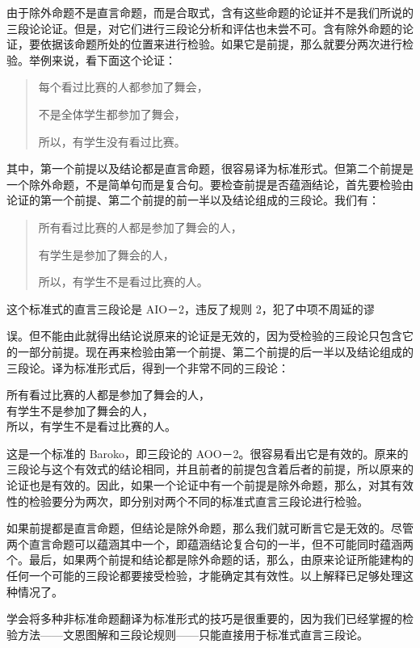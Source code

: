 由于除外命题不是直言命题，而是合取式，含有这些命题的论证并不是我们所说的三段论论证。但是，对它们进行三段论分析和评估也未尝不可。含有除外命题的论证，要依据该命题所处的位置来进行检验。如果它是前提，那么就要分两次进行检验。举例来说，看下面这个论证：

\begin{quote}
每个看过比赛的人都参加了舞会，

不是全体学生都参加了舞会，

所以，有学生没有看过比赛。
\end{quote}

其中，第一个前提以及结论都是直言命题，很容易译为标准形式。但第二个前提是一个除外命题，不是简单句而是复合句。要检查前提是否蕴涵结论，首先要检验由论证的第一个前提、第二个前提的前一半以及结论组成的三段论。我们有：

\begin{quote}
所有看过比赛的人都是参加了舞会的人，

有学生是参加了舞会的人，

所以，有学生不是看过比赛的人。
\end{quote}

这个标准式的直言三段论是 AIO－2，违反了规则 2，犯了中项不周延的谬

误。但不能由此就得出结论说原来的论证是无效的，因为受检验的三段论只包含它的一部分前提。现在再来检验由第一个前提、第二个前提的后一半以及结论组成的三段论。译为标准形式后，得到一个非常不同的三段论：

所有看过比赛的人都是参加了舞会的人，\\
有学生不是参加了舞会的人，\\
所以，有学生不是看过比赛的人。

这是一个标准的 Baroko，即三段论的 AOO－2。很容易看出它是有效的。原来的三段论与这个有效式的结论相同，并且前者的前提包含着后者的前提，所以原来的论证也是有效的。因此，如果一个论证中有一个前提是除外命题，那么，对其有效性的检验要分为两次，即分别对两个不同的标准式直言三段论进行检验。

如果前提都是直言命题，但结论是除外命题，那么我们就可断言它是无效的。尽管两个直言命题可以蕴涵其中一个，即蕴涵结论复合句的一半，但不可能同时蕴涵两个。最后，如果两个前提和结论都是除外命题的话，那么，由原来论证所能建构的任何一个可能的三段论都要接受检验，才能确定其有效性。以上解释已足够处理这种情况了。

学会将多种非标准命题翻译为标准形式的技巧是很重要的，因为我们已经掌握的检验方法——文恩图解和三段论规则——只能直接用于标准式直言三段论。

